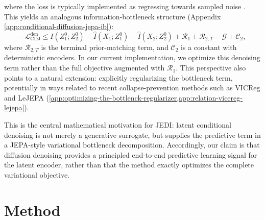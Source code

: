 \documentclass{article}
\begin{document}
where the loss is typically implemented as regressing towards sampled noise \citep{ho2020ddpm}. This yields an analogous information-bottleneck structure (Appendix \ref{app:conditional-diffusion-jepa-ib}):
\begin{equation}
-\mathcal L_{\mathrm{CDJ}}^{\mathrm{den}}
\le
I(Z_1^0;Z_2^0)
-
\widehat I(X_1;Z_1^0)
-
\widehat I(X_2;Z_2^0)
+
\mathcal R_1
+
\mathcal R_{2,T}
-
\mathcal G
+
\mathcal C_2,
\label{eq:main_cdj_ib_den}
\end{equation}
where $\mathcal R_{2,T}$ is the terminal prior-matching term, and $\mathcal C_2$ is a constant with deterministic encoders. In our current implementation, we optimize this denoising term rather than the full objective augmented with $\mathcal R_1$. This perspective also points to a natural extension: explicitly regularizing the bottleneck term, potentially in ways related to recent collapse-prevention methods such as VICReg and LeJEPA \citep{shwartz2023informationVICREG, balestriero2025lejepa} (\cref{app:optimizing-the-bottlenck-regularizer,app:relation-vicereg-lejepa}).

This is the central mathematical motivation for JEDI: latent conditional denoising is not merely a generative surrogate, but supplies the predictive term in a JEPA-style variational bottleneck decomposition. Accordingly, our claim is that diffusion denoising provides a principled end-to-end predictive learning signal for the latent encoder, rather than that the method exactly optimizes the complete variational objective. 

\section{Method}
\label{sec:method_jedi}

\end{document}
